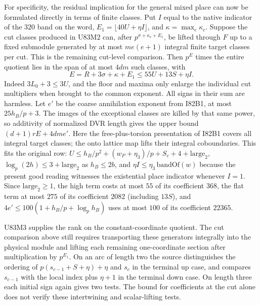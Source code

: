 For specificity, the residual implication for the general mixed
place can now be formulated directly in terms of finite classes.
Put $I$ equal to the native indicator of the $320$ band on the
word, $E_1=\lfloor40U+\eta I\rfloor$, and
$\kappa=\max_c\kappa_c$. Suppose the cut classes produced in
U83M2 can, after $p^{\sigma+\kappa_c+E_1}$, be lifted through
$F$ up to a fixed submodule generated by at most $me(e+1)$
integral finite target classes per cut. This is the remaining
cut-level comparison. Then $p^E$ times the entire quotient lies
in the span of at most $4dm$ such classes, with
\[
 E=R+3\sigma+\kappa+E_1\le55U+13S+\eta I .
\]
Indeed $3L_0+3\le3U$, and the floor and maxima only enlarge the
individual cut multipliers when brought to the common exponent.
All signs in their sum are harmless. Let $e'$ be the coarse
annihilation exponent from I82B1, at most $25h_B/p+3$. The
images of the exceptional classes are killed by that same power,
so additivity of normalized DVR length gives the upper bound
$(d+1)rE+4dm e'$. Here the free-plus-torsion presentation of
I82B1 covers all integral target classes; the onto lattice map
lifts their integral coboundaries. This fits the original row:
$U\le h_B/p^2+(w_P+\eta_3)/p+S_c+4+\mathrm{large}_2$,
$\log_p(2h)\le 3+\mathrm{large}_2$ as $h_B\le2b$, and
$\eta I\le\eta_3\,\mathrm{bandOf}(w)$ because the present good
reading witnesses the existential place indicator whenever $I=1$. Since
$\mathrm{large}_2\ge1$, the high term costs at most $55$ of its
coefficient $368$, the flat term at most $275$ of its coefficient
$2082$ (including $13S$), and $4 e'\le100(1+h_B/p+\log_p h_B)$
uses at most $100$ of its coefficient $22365$.

U83M3 supplies the rank on the constant-coordinate quotient.
The cut comparison above still requires transporting these
generators integrally into the physical module and lifting each
remaining one-coordinate section after multiplication by
$p^{E_1}$. On an arc of length two the source distinguishes the
ordering of $p(s_{c-1}+S+\eta)+\eta$ and $s_c$ in the terminal
up case, and compares $s_{c-1}$ with the local index plus $\eta+1$
in the terminal down case. On length three each initial sign
again gives two tests. The bound for coefficients at the cut
alone does not verify these intertwining and scalar-lifting tests.

